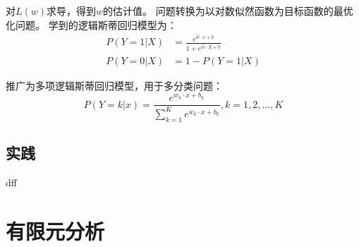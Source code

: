 \documentclass[12pt]{article}
\begin{document}
对$L(w)$求导，得到$w$的估计值。
问题转换为以对数似然函数为目标函数的最优化问题。
学到的逻辑斯蒂回归模型为：
\begin{align*}
    P(Y=1|X) &= \frac{ e^{\hat{w} \cdot x + b} }{1 + e^{\hat{w} \cdot X + b}} \\
    P(Y=0|X) &= 1 - P(Y=1|X)
\end{align*}

推广为多项逻辑斯蒂回归模型，用于多分类问题：
$$
P(Y=k|x) = \frac {e^{w_k \cdot x + b_k}}{\sum_{k=1}^{K} e^{w_k \cdot x + b_k}} , k = 1,2,...,K
$$
\subsection{实践}


dff
\section{有限元分析}
\end{document}

